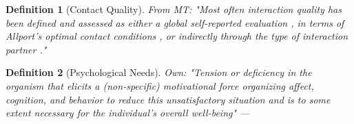 \documentclass[nobib]{tufte-handout}
\theoremstyle{break}
\newtheorem{definition}{Definition}
\theoremstyle{plain}
\begin{document}
\begin{framed}
    \begin{definition}[Contact Quality]
         From MT: "Most often interaction quality has been defined and assessed as either a global self-reported evaluation \citep[e.g.,][]{Voci2003}, in terms of Allport’s optimal contact conditions \citep[e.g.,][]{Brown2005, Pettigrew2006}, or indirectly through the type of interaction partner \citep[e.g., intergroup friendship,][]{Turner2007}."
    \end{definition}  
\end{framed}

\begin{framed}
    \begin{definition}[Psychological Needs]
        Own: "Tension or deficiency in the organism that elicits a (non-specific) motivational force organizing affect, cognition, and behavior to reduce this unsatisfactory situation and is to some extent necessary for the individual’s overall well-being" --- \citep[based on][]{Hull1943, Lewin1938, McClelland1987, Murray1938, Ryan2017, Steverink2006}
    \end{definition}  
\end{framed}



\newpage
\printbibliography
\end{document}
